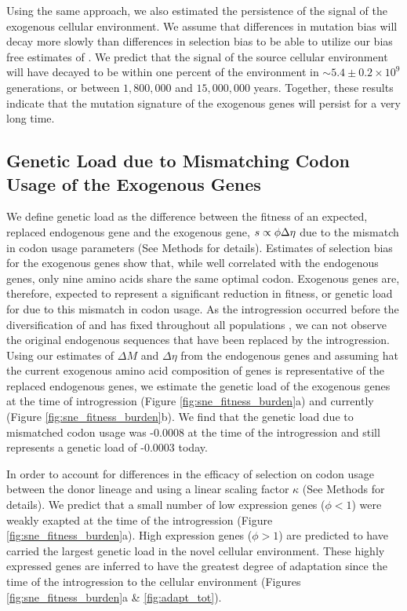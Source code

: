 \documentclass[fleqn,letterpaper]{article}
\begin{document}
Using the same approach, we also estimated the persistence of the signal of the exogenous cellular environment.
We assume that differences in mutation bias will decay more slowly than differences in selection bias to be able to utilize our bias free estimates of \DM.
We predict that the \DM signal of the source cellular environment will have decayed to be within one percent of the \kluyveri environment in $\sim 5.4\pm0.2\times 10^9 $ generations, or between $1,800,000$ and $15,000,000$ years.
Together, these results indicate that the mutation signature of the exogenous genes will persist for a very long time.

\subsection*{Genetic Load due to Mismatching Codon Usage of the Exogenous Genes}

We define genetic load as the difference between the fitness of an expected, replaced endogenous gene and the exogenous gene, $s \propto \phi {\Delta \eta}$ due to the mismatch in codon usage parameters (See Methods for details).
Estimates of selection bias for the exogenous genes show that, while well correlated with the endogenous genes, only nine amino acids share the same optimal codon.
Exogenous genes are, therefore, expected to represent a significant reduction in fitness, or genetic load for \kluyveri due to this mismatch in codon usage.
As the introgression occurred before the diversification of \kluyveri and has fixed throughout all populations \citep{friedrich2015}, we can not observe the original endogenous sequences that have been replaced by the introgression.
Using our estimates of $\Delta M$ and $\Delta \eta$ from the endogenous genes and assuming hat the current exogenous amino acid composition of genes is representative of the replaced endogenous genes, we estimate the genetic load of the exogenous genes at the time of introgression (Figure \ref{fig:sne_fitness_burden}a) and currently (Figure \ref{fig:sne_fitness_burden}b).
We find that the genetic load due to mismatched codon usage was -0.0008 at the time of the introgression and still represents a genetic load of -0.0003 today.

In order to account for differences in the efficacy of selection on codon usage between the donor lineage and \kluyveri using a linear scaling factor $\kappa$ (See Methods for details).
We predict that a small number of low expression genes ($\phi < 1$) were weakly exapted at the time of the introgression (Figure \ref{fig:sne_fitness_burden}a).
High expression genes ($\phi > 1$) are predicted to have carried the largest genetic load in the novel cellular environment.
These highly expressed genes are inferred to have the greatest degree of adaptation since the time of the introgression to the \kluyveri cellular environment (Figures \ref{fig:sne_fitness_burden}a \& \ref{fig:adapt_tot}).
\end{document}
